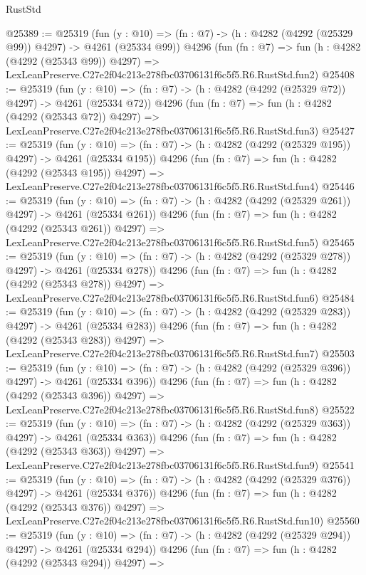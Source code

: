 \begin{lexlean}{RustStd}
\begin{coremodule}
@25389 := @25319
    (fun (y : @10) => (fn : @7) -> (h : @4282 (@4292 (@25329 @99)) @4297) -> @4261 (@25334 @99))
    @4296
    (fun (fn : @7) =>
    fun (h : @4282 (@4292 (@25343 @99)) @4297) =>
    LexLeanPreserve.C27e2f04c213e278fbc03706131f6c5f5.R6.RustStd.fun2)
@25408 := @25319
    (fun (y : @10) => (fn : @7) -> (h : @4282 (@4292 (@25329 @72)) @4297) -> @4261 (@25334 @72))
    @4296
    (fun (fn : @7) =>
    fun (h : @4282 (@4292 (@25343 @72)) @4297) =>
    LexLeanPreserve.C27e2f04c213e278fbc03706131f6c5f5.R6.RustStd.fun3)
@25427 := @25319
    (fun (y : @10) => (fn : @7) -> (h : @4282 (@4292 (@25329 @195)) @4297) -> @4261 (@25334 @195))
    @4296
    (fun (fn : @7) =>
    fun (h : @4282 (@4292 (@25343 @195)) @4297) =>
    LexLeanPreserve.C27e2f04c213e278fbc03706131f6c5f5.R6.RustStd.fun4)
@25446 := @25319
    (fun (y : @10) => (fn : @7) -> (h : @4282 (@4292 (@25329 @261)) @4297) -> @4261 (@25334 @261))
    @4296
    (fun (fn : @7) =>
    fun (h : @4282 (@4292 (@25343 @261)) @4297) =>
    LexLeanPreserve.C27e2f04c213e278fbc03706131f6c5f5.R6.RustStd.fun5)
@25465 := @25319
    (fun (y : @10) => (fn : @7) -> (h : @4282 (@4292 (@25329 @278)) @4297) -> @4261 (@25334 @278))
    @4296
    (fun (fn : @7) =>
    fun (h : @4282 (@4292 (@25343 @278)) @4297) =>
    LexLeanPreserve.C27e2f04c213e278fbc03706131f6c5f5.R6.RustStd.fun6)
@25484 := @25319
    (fun (y : @10) => (fn : @7) -> (h : @4282 (@4292 (@25329 @283)) @4297) -> @4261 (@25334 @283))
    @4296
    (fun (fn : @7) =>
    fun (h : @4282 (@4292 (@25343 @283)) @4297) =>
    LexLeanPreserve.C27e2f04c213e278fbc03706131f6c5f5.R6.RustStd.fun7)
@25503 := @25319
    (fun (y : @10) => (fn : @7) -> (h : @4282 (@4292 (@25329 @396)) @4297) -> @4261 (@25334 @396))
    @4296
    (fun (fn : @7) =>
    fun (h : @4282 (@4292 (@25343 @396)) @4297) =>
    LexLeanPreserve.C27e2f04c213e278fbc03706131f6c5f5.R6.RustStd.fun8)
@25522 := @25319
    (fun (y : @10) => (fn : @7) -> (h : @4282 (@4292 (@25329 @363)) @4297) -> @4261 (@25334 @363))
    @4296
    (fun (fn : @7) =>
    fun (h : @4282 (@4292 (@25343 @363)) @4297) =>
    LexLeanPreserve.C27e2f04c213e278fbc03706131f6c5f5.R6.RustStd.fun9)
@25541 := @25319
    (fun (y : @10) => (fn : @7) -> (h : @4282 (@4292 (@25329 @376)) @4297) -> @4261 (@25334 @376))
    @4296
    (fun (fn : @7) =>
    fun (h : @4282 (@4292 (@25343 @376)) @4297) =>
    LexLeanPreserve.C27e2f04c213e278fbc03706131f6c5f5.R6.RustStd.fun10)
@25560 := @25319
    (fun (y : @10) => (fn : @7) -> (h : @4282 (@4292 (@25329 @294)) @4297) -> @4261 (@25334 @294))
    @4296
    (fun (fn : @7) =>
    fun (h : @4282 (@4292 (@25343 @294)) @4297) =>

\end{coremodule}
\end{lexlean}
